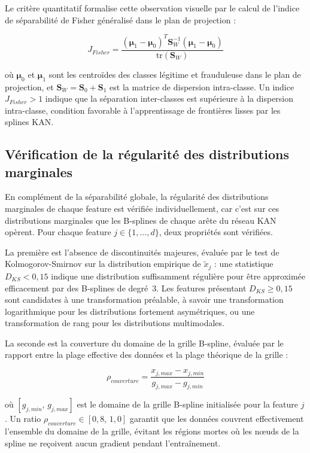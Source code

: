 \documentclass[11pt,a4paper,oneside]{report}
\theoremstyle{definition}
\theoremstyle{remark}
\begin{document}
Le critère quantitatif formalise cette observation visuelle par le calcul de l'indice de séparabilité de Fisher généralisé dans le plan de projection :

\begin{equation}
    J_{Fisher} = \frac{(\boldsymbol{\mu}_1 - \boldsymbol{\mu}_0)^T \mathbf{S}_W^{-1} (\boldsymbol{\mu}_1 - \boldsymbol{\mu}_0)}{\text{tr}(\mathbf{S}_W)}
\end{equation}

où $\boldsymbol{\mu}_0$ et $\boldsymbol{\mu}_1$ sont les centroïdes des classes légitime et frauduleuse dans le plan de projection, et $\mathbf{S}_W = \mathbf{S}_0 + \mathbf{S}_1$ est la matrice de dispersion intra-classe. Un indice $J_{Fisher} > 1$ indique que la séparation inter-classes est supérieure à la dispersion intra-classe, condition favorable à l'apprentissage de frontières lisses par les splines KAN.

\subsection{Vérification de la régularité des distributions marginales}

En complément de la séparabilité globale, la régularité des distributions marginales de chaque feature est vérifiée individuellement, car c'est sur ces distributions marginales que les B-splines de chaque arête du réseau KAN opèrent. Pour chaque feature $j \in \{1, \ldots, d\}$, deux propriétés sont vérifiées.

La première est l'absence de discontinuités majeures, évaluée par le test de Kolmogorov-Smirnov sur la distribution empirique de $\tilde{x}_j$ : une statistique $D_{KS} < 0{,}15$ indique une distribution suffisamment régulière pour être approximée efficacement par des B-splines de degré~3. Les features présentant $D_{KS} \geq 0{,}15$ sont candidates à une transformation préalable, à savoir une transformation logarithmique pour les distributions fortement asymétriques, ou une transformation de rang pour les distributions multimodales.

La seconde est la couverture du domaine de la grille B-spline, évaluée par le rapport entre la plage effective des données et la plage théorique de la grille :

\begin{equation}
    \rho_{couverture} = \frac{x_{j,max} - x_{j,min}}{g_{j,max} - g_{j,min}}
\end{equation}

où $[g_{j,min},\, g_{j,max}]$ est le domaine de la grille B-spline initialisée pour la feature $j$. Un ratio $\rho_{couverture} \in [0{,}8,\, 1{,}0]$ garantit que les données couvrent effectivement l'ensemble du domaine de la grille, évitant les régions mortes où les nœuds de la spline ne reçoivent aucun gradient pendant l'entraînement.
\end{document}
